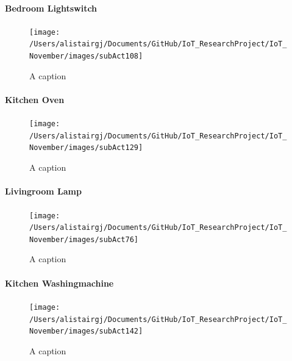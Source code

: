 \documentclass[11pt,]{article}
\let\oldparagraph\paragraph
\renewcommand{\paragraph}[1]{\oldparagraph{#1}\mbox{}}
\begin{document}
\hypertarget{bedroom-lightswitch}{%
\paragraph{Bedroom Lightswitch}\label{bedroom-lightswitch}}

\begin{figure}[H]

{\centering \texttt{[image: /Users/alistairgj/Documents/GitHub/IoT\_ResearchProject/IoT\_November/images/subAct108]} 

}

\caption{A caption}\label{fig:subAct108}
\end{figure}

\hypertarget{kitchen-oven}{%
\paragraph{Kitchen Oven}\label{kitchen-oven}}

\begin{figure}[H]

{\centering \texttt{[image: /Users/alistairgj/Documents/GitHub/IoT\_ResearchProject/IoT\_November/images/subAct129]} 

}

\caption{A caption}\label{fig:subAct129}
\end{figure}

\hypertarget{livingroom-lamp}{%
\paragraph{Livingroom Lamp}\label{livingroom-lamp}}

\begin{figure}[H]

{\centering \texttt{[image: /Users/alistairgj/Documents/GitHub/IoT\_ResearchProject/IoT\_November/images/subAct76]} 

}

\caption{A caption}\label{fig:subAct76}
\end{figure}

\hypertarget{kitchen-washingmachine}{%
\paragraph{Kitchen Washingmachine}\label{kitchen-washingmachine}}

\begin{figure}[H]

{\centering \texttt{[image: /Users/alistairgj/Documents/GitHub/IoT\_ResearchProject/IoT\_November/images/subAct142]} 

}

\caption{A caption}\label{fig:subAct142}
\end{figure}
\end{document}
